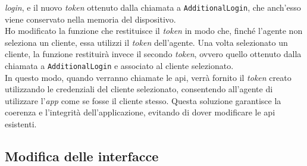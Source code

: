 \textit{login}, e il nuovo \textit{token} ottenuto dalla chiamata a \texttt{AdditionalLogin}, che anch'esso viene 
conservato nella memoria del dispositivo.\\
Ho modificato la funzione che restituisce il \textit{token} in modo che, finché l'agente non seleziona un cliente, 
essa utilizzi il \textit{token} dell'agente. Una volta selezionato un cliente, la funzione restituirà invece il 
secondo \textit{token}, ovvero quello ottenuto dalla chiamata a \texttt{AdditionalLogin} e associato al cliente 
selezionato.\\
In questo modo, quando verranno chiamate le \gls{api}, verrà fornito il \textit{token} creato utilizzando le 
credenziali del cliente selezionato, consentendo all'agente di utilizzare l'\textit{app} come se fosse il 
cliente stesso. Questa soluzione garantisce la coerenza e l'integrità dell'applicazione, evitando di dover 
modificare le \gls{api} esistenti.

\subsection{Modifica delle interfacce}

